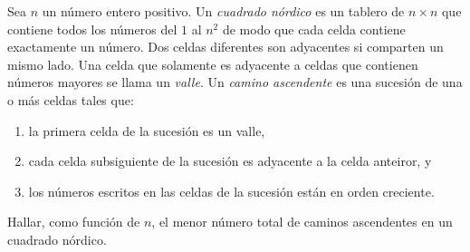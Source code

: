 Sea $n$ un número entero positivo. Un \emph{cuadrado nórdico} es un tablero de $n\times n$ que contiene todos los números del $1$ al $n^2$ de modo que cada celda contiene exactamente un número. Dos celdas diferentes son adyacentes si comparten un mismo lado. Una celda que solamente es adyacente a celdas que contienen números mayores se llama un \emph{valle}. Un \emph{camino ascendente} es una sucesión de una o más celdas tales que:
\begin{enumerate}
 \item  la primera celda de la sucesión es un valle,
 \item  cada celda subsiguiente de la sucesión es adyacente a la celda anteiror, y
 \item  los números escritos en las celdas de la sucesión están en orden creciente.
 \end{enumerate} 
Hallar, como función de $n$, el menor número total de caminos ascendentes en un cuadrado nórdico.
